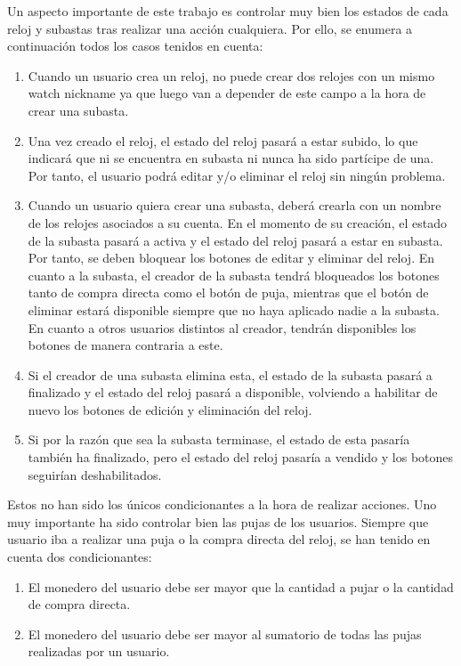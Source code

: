 	Un aspecto importante de este trabajo es controlar muy bien los estados de cada reloj y subastas tras realizar una acción cualquiera. Por ello, se enumera a continuación todos los casos tenidos en cuenta:
	\begin{enumerate}
		\item Cuando un usuario crea un reloj, no puede crear dos relojes con un mismo watch nickname ya que luego van a depender de este campo a la hora de crear una subasta.
		\item Una vez creado el reloj, el estado del reloj pasará a estar subido, lo que indicará que ni se encuentra en subasta ni nunca ha sido partícipe de una. Por tanto, el usuario podrá editar y/o eliminar el reloj sin ningún problema.
		\item Cuando un usuario quiera crear una subasta, deberá crearla con un nombre de los relojes asociados a su cuenta. En el momento de su creación, el estado de la subasta pasará a activa y el estado del reloj pasará a estar en subasta. Por tanto, se deben bloquear los botones de editar y eliminar del reloj. En cuanto a la subasta, el creador de la subasta tendrá bloqueados los botones tanto de compra directa como el botón de puja, mientras que el botón de eliminar estará disponible siempre que no haya aplicado nadie a la subasta. En cuanto a otros usuarios distintos al creador, tendrán disponibles los botones de manera contraria a este.
		\item Si el creador de una subasta elimina esta, el estado de la subasta pasará a finalizado y el estado del reloj pasará a disponible, volviendo a habilitar de nuevo los botones de edición y eliminación del reloj.
		\item Si por la razón que sea la subasta terminase, el estado de esta pasaría también ha finalizado, pero el estado del reloj pasaría a vendido y los botones seguirían deshabilitados.
	\end{enumerate}
	
	Estos no han sido los únicos condicionantes a la hora de realizar acciones. Uno muy importante ha sido controlar bien las pujas de los usuarios. Siempre que usuario iba a realizar una puja o la compra directa del reloj, se han tenido en cuenta dos condicionantes:
	\begin{enumerate}
		\item El monedero del usuario debe ser mayor que la cantidad a pujar o la cantidad de compra directa.
		\item El monedero del usuario debe ser mayor al sumatorio de todas las pujas realizadas por un usuario.
	\end{enumerate}
	
